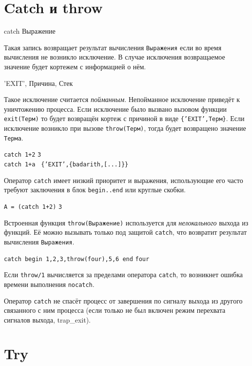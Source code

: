 \section{Catch и throw}
\label{errorhandling:catchthrow}
\begin{erlangru}
catch Выражение
\end{erlangru}

Такая запись возвращает результат вычисления \texttt{Выражения} если во время 
вычисления не возникло исключение. В случае исключения возвращаемое значение будет
кортежем с информацией о нём.

\begin{erlangru}
{'EXIT', {Причина, Стек}}
\end{erlangru}

Такое исключение считается \emph{пойманным}. Непойманное исключение приведёт к 
уничтожению процесса. Если исключение было вызвано вызовом функции 
\texttt{exit(Терм)} то будет возвращён кортеж с причиной в виде 
\texttt{\{'EXIT',Терм\}}. Если исключение возникло при вызове \texttt{throw(Терм)},
тогда будет возвращено значение \texttt{Терма}.

\texttt{catch 1+2} \resultingin \texttt{3}\\
\texttt{catch 1+a } \resultingin \texttt{\{'EXIT',\{badarith,[...]\}\}}

Оператор \texttt{catch} имеет низкий приоритет и выражения, использующие его часто
требуют заключения в блок \texttt{begin..end} или круглые скобки.

\texttt{A = (catch 1+2)} \resultingin \texttt{3}

Встроенная функция \texttt{throw(Выражение)} используется для \emph{нелокального}
выхода из функций. Её можно вызывать только под защитой \texttt{catch}, что 
возвратит результат вычисления \texttt{Выражения}.

\texttt{catch begin 1,2,3,throw(four),5,6 end} \resultingin \texttt{four}

Если \texttt{throw/1} вычисляется за пределами оператора \texttt{catch}, то 
возникнет ошибка времени выполнения \texttt{nocatch}.

Оператор \texttt{catch} не спасёт процесс от завершения по сигналу выхода из 
другого связанного с ним процесса (если только не был включен режим перехвата 
сигналов выхода, trap\_exit).


\section{Try}
\label{errorhandling:try}

